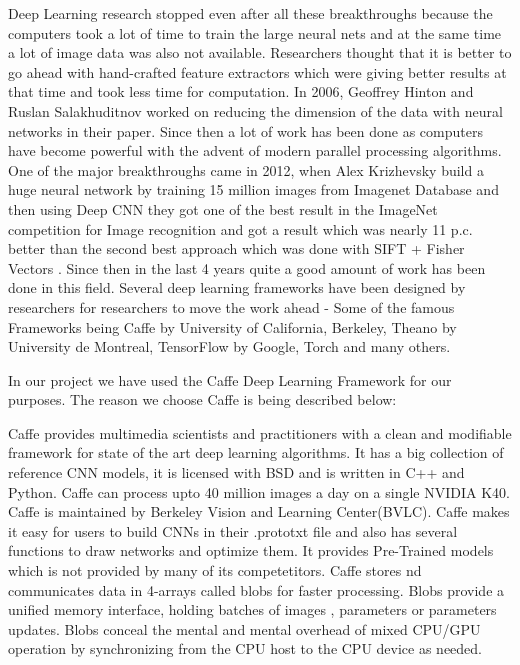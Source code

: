 Deep Learning research stopped even after all these breakthroughs because the computers took a lot of time to train the large neural nets and at the same time a lot of image data was also not available. Researchers thought that it is better to go ahead with hand-crafted feature extractors which were giving better results at that time and took less time for computation. In 2006, Geoffrey Hinton and Ruslan Salakhuditnov worked on reducing the dimension of the data with neural networks in their paper\cite{dbn}. Since then a lot of work has been done as computers have become powerful with the advent of modern parallel processing algorithms. One of the major breakthroughs came in 2012, when Alex Krizhevsky\cite{krizhevsky} build a huge neural network by training 15 million images from Imagenet\cite{imagenet} Database and then using Deep CNN they got one of the best result in the ImageNet competition for Image recognition and got a result which  was nearly 11 p.c. better than the second best approach which was done with SIFT + Fisher Vectors \cite{siftfisher}. Since then in the last 4 years quite a good amount of work has been done in this field. Several deep learning frameworks have been designed by researchers for researchers to move the work ahead - Some of the famous Frameworks being Caffe\cite{caffe} by University of California, Berkeley, Theano\cite{theano} by University de Montreal, TensorFlow\cite{tensorflow} by Google, Torch\cite{torch} and many others.

In our project we have used the Caffe Deep Learning Framework\cite{caffe} for our purposes. The reason we choose Caffe is being described below:

Caffe provides multimedia scientists and practitioners with a clean and modifiable framework for state of the art deep learning algorithms. It has a big collection of reference CNN models, it is licensed with BSD and is written in C++ and Python. Caffe can process upto 40 million images a day on a single NVIDIA K40. Caffe is maintained by Berkeley Vision and Learning Center(BVLC). Caffe makes it easy for users to build CNNs in their .prototxt file and also has several functions to draw networks and optimize them. It provides Pre-Trained models which is not provided by many of its competetitors. Caffe stores nd communicates data in 4-arrays called blobs for faster processing. Blobs provide a unified memory interface, holding batches of images , parameters or parameters updates. Blobs conceal the mental and mental overhead of mixed CPU/GPU operation by synchronizing from the CPU host to the CPU device as needed. 

